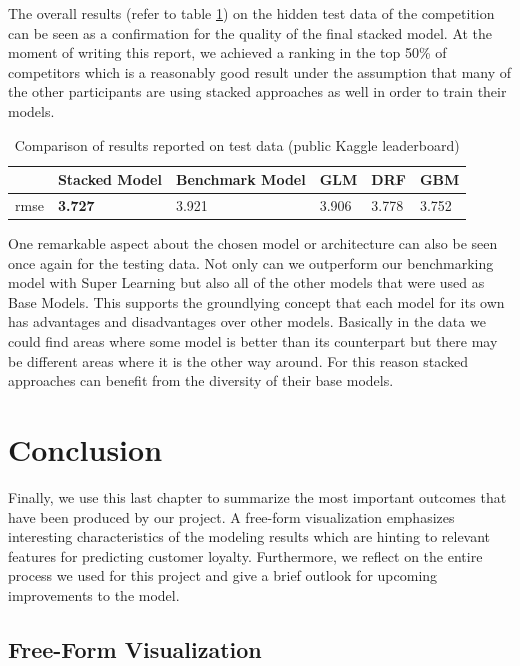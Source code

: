 \documentclass{article}
\begin{document}
The overall results (refer to table \ref{tab:test_comparison}) on the hidden test data of the competition can be seen as a confirmation for the quality of the final stacked model. At the moment of writing this report, we achieved a ranking in the top 50\% of competitors which is a reasonably good result under the assumption that many of the other participants are using stacked approaches as well in order to train their models.

\begin{table}[h]
 \caption{Comparison of results reported on test data (public Kaggle leaderboard)}
  \centering
  \begin{tabular}{llllll}
    \toprule
     &          Stacked Model & Benchmark Model & GLM & DRF & GBM \\
    \midrule
    rmse&       \textbf{3.727}&3.921&3.906&3.778&3.752\\
    \bottomrule
  \end{tabular}
  \label{tab:test_comparison}
\end{table}

One remarkable aspect about the chosen model or architecture can also be seen once again for the testing data. Not only can we outperform our benchmarking model with Super Learning but also all of the other models that were used as Base Models. This supports the groundlying concept that each model for its own has advantages and disadvantages over other models. Basically in the data we could find areas where some model is better than its counterpart but there may be different areas where it is the other way around. For this reason stacked approaches can benefit from the diversity of their base models.


\newpage
\section{Conclusion}
Finally, we use this last chapter to summarize the most important outcomes that have been produced by our project. A free-form visualization emphasizes interesting characteristics of the modeling results which are hinting to relevant features for predicting customer loyalty. Furthermore, we reflect on the entire process we used for this project and give a brief outlook for upcoming improvements to the model.

\subsection{Free-Form Visualization}
\end{document}
